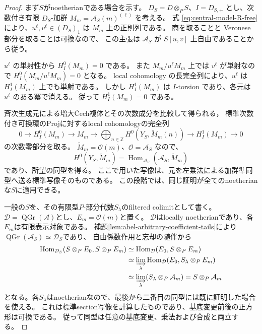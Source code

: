 \begin{proof}
まず$S$がnoetherianである場合を示す。
$D_S=D\otimes_P S$、$I=D_{S,+}$ とし、次数付き有限 $D_S$-加群
$M_m=\mathcal A_S(m)^{(\ell)}$ を考える。
式 \eqref{eq:central-model-R-free} により、$u^\ell,v^\ell\in (D_S)_1$
は $M_m$ 上の正則列である。
商を取ることと Veronese 部分を取ることは可換なので、
この主張は $\mathcal A_S$ が $S[u,v]$ 上自由であることから従う。

$u^\ell$ の単射性から $H^0_I(M_m)=0$ である。
また $M_m/u^\ell M_m$ 上では $v^\ell$ が単射なので
$H^0_I(M_m/u^\ell M_m)=0$ となる。
local cohomology の長完全列により、$u^\ell$ は $H^1_I(M_m)$ 上でも単射である。
しかし $H^1_I(M_m)$ は $I$-torsion であり、各元は $u^\ell$ のある冪で消える。
従って $H^1_I(M_m)=0$ である。

斉次生成元による増大\v{C}ech複体とその次数成分を比較して得られる，
標準次数付き可換環のProjに対するlocal cohomologyの完全列
\[
 0\longrightarrow H^0_I(M_m)\longrightarrow M_m
 \longrightarrow\bigoplus_{n\in\mathbb Z}
 H^0(Y_S,\widetilde M_m(n))\longrightarrow H^1_I(M_m)
 \longrightarrow0
\]
の次数零部分を取る。
$\widetilde M_m=\mathcal O(m)$、$\mathcal O=\mathscr A_S$ なので、
\[
 H^0(Y_S,\widetilde M_m)
 =\operatorname{Hom}_{\mathscr A_S}(\mathscr A_S,\widetilde M_m)
\]
であり、所望の同型を得る。
ここで用いた写像は、元を左乗法による加群準同型へ送る標準写像そのものである。
この段階では、同じ証明が全てのnoetherianな$S$に適用できる。

一般の$S$を、その有限型$P$-部分代数$S_\lambda$のfiltered colimitとして書く。
$\mathcal D=\operatorname{QGr}(\mathcal A)$とし、$E_m=\mathcal O(m)$と置く。
$\mathcal D$はlocally noetherianであり、各$E_m$は有限表示対象である。
補題\ref{lem:abel-arbitrary-coefficient-tails}により
$\operatorname{QGr}(\mathcal A_S)\simeq\mathcal D_S$であり、
自由係数作用と忘却の随伴から
\begin{align*}
 \operatorname{Hom}_{\mathcal D_S}(S\otimes_P E_0,S\otimes_P E_m)
 &\simeq\operatorname{Hom}_{\mathcal D}(E_0,S\otimes_P E_m)\\
 &\simeq\varinjlim_\lambda
       \operatorname{Hom}_{\mathcal D}(E_0,S_\lambda\otimes_P E_m)\\
 &\simeq\varinjlim_\lambda(S_\lambda\otimes_P\mathcal A_m)
  =S\otimes_P\mathcal A_m
\end{align*}
となる。各$S_\lambda$はnoetherianなので、最後から二番目の同型には既に証明した場合を使える。
これは標準section写像を計算したものであり、基底変更前後の正方形は可換である。
従って同型は任意の基底変更、乗法および合成と両立する。
\end{proof}

